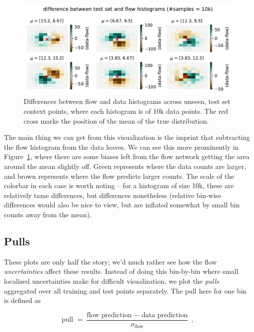 \documentclass[
  11pt,
  numbers=noendperiod]{book}
\begin{document}
\begin{figure}

{\centering \includegraphics{./images/flows/simple/simplehistdifftest-errors.pdf}

}

\caption{\label{fig-simple-hists-test}Differences between flow and data
histograms across unseen, test set context points, where each histogram
is of 10k data points. The red cross marks the position of the mean of
the true distribution.}

\end{figure}

The main thing we can get from this visualization is the imprint that
subtracting the flow histogram from the data leaves. We can see this
more prominently in Figure~\ref{fig-simple-hists-test}, where there are
some biases left from the flow network getting the area around the mean
slightly off. Green represents where the data counts are larger, and
brown represents where the flow predicts larger counts. The scale of the
colorbar in each case is worth noting -- for a histogram of size 10k,
these are relatively tame differences, but differences nonetheless
(relative bin-wise differences would also be nice to view, but are
inflated somewhat by small bin counts away from the mean).

\hypertarget{pulls}{%
\subsection{Pulls}\label{pulls}}

These plots are only half the story; we'd much rather see how the flow
\emph{uncertainties} affect these results. Instead of doing this
bin-by-bin where small localized uncertainties make for difficult
visualization, we plot the \emph{pulls} aggregated over all training and
test points separately. The pull here for one bin is defined as

\[
\text{pull } = \frac{\text{flow prediction }-\text{ data prediction}}{\sigma_{\text{flow}}}~,
\]
\end{document}

